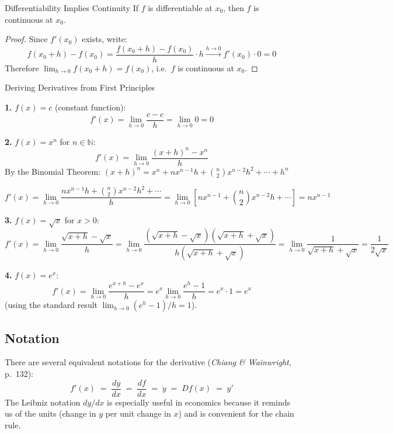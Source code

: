 \documentclass[12pt, a4paper]{article}
\theoremstyle{definition}
\newcommand{\ddd}[2]{\dfrac{d#1}{d#2}}
\newcommand{\limit}[2]{\lim_{#1 \to #2}}
\begin{document}
\begin{thmbox}{Differentiability Implies Continuity}
\label{thm:diff_cont}
If $f$ is differentiable at $x_0$, then $f$ is continuous at $x_0$.
\end{thmbox}

\begin{proof}
Since $f'(x_0)$ exists, write:
\[
  f(x_0+h) - f(x_0)
  = \frac{f(x_0+h)-f(x_0)}{h} \cdot h
  \xrightarrow{h\to 0} f'(x_0)\cdot 0 = 0
\]
Therefore $\displaystyle\limit{h}{0}f(x_0+h) = f(x_0)$, i.e.\ $f$ is continuous at $x_0$.
\end{proof}

\begin{exbox}{Deriving Derivatives from First Principles}

\textbf{1.} $f(x) = c$ (constant function):
\[
  f'(x) = \limit{h}{0}\frac{c - c}{h} = \limit{h}{0}0 = 0
\]

\textbf{2.} $f(x) = x^n$ for $n \in \mathbb{N}$:
\[
  f'(x)
  = \limit{h}{0}\frac{(x+h)^n - x^n}{h}
\]
By the Binomial Theorem:
$(x+h)^n = x^n + nx^{n-1}h + \binom{n}{2}x^{n-2}h^2 + \cdots + h^n$

\[
  f'(x) = \limit{h}{0}\frac{nx^{n-1}h + \binom{n}{2}x^{n-2}h^2 + \cdots}{h}
         = \limit{h}{0}\left[nx^{n-1} + \binom{n}{2}x^{n-2}h + \cdots\right]
         = nx^{n-1}
\]

\textbf{3.} $f(x) = \sqrt{x}$ for $x > 0$:
\[
  f'(x) = \limit{h}{0}\frac{\sqrt{x+h}-\sqrt{x}}{h}
         = \limit{h}{0}\frac{(\sqrt{x+h}-\sqrt{x})(\sqrt{x+h}+\sqrt{x})}
                            {h(\sqrt{x+h}+\sqrt{x})}
         = \limit{h}{0}\frac{1}{\sqrt{x+h}+\sqrt{x}}
         = \frac{1}{2\sqrt{x}}
\]

\textbf{4.} $f(x) = e^x$:
\[
  f'(x) = \limit{h}{0}\frac{e^{x+h}-e^x}{h}
         = e^x\limit{h}{0}\frac{e^h-1}{h} = e^x \cdot 1 = e^x
\]
(using the standard result $\lim_{h\to 0}(e^h-1)/h = 1$).
\end{exbox}

\subsection{Notation}

There are several equivalent notations for the derivative
(\textit{Chiang \& Wainwright}, p.\ 132):
\[
  f'(x) \;=\; \ddd{y}{x} \;=\; \ddd{f}{x} \;=\; \dot y \;=\; Df(x) \;=\; y'
\]
The Leibniz notation $dy/dx$ is especially useful in economics because it
reminds us of the units (change in $y$ per unit change in $x$) and is
convenient for the chain rule.
\end{document}
